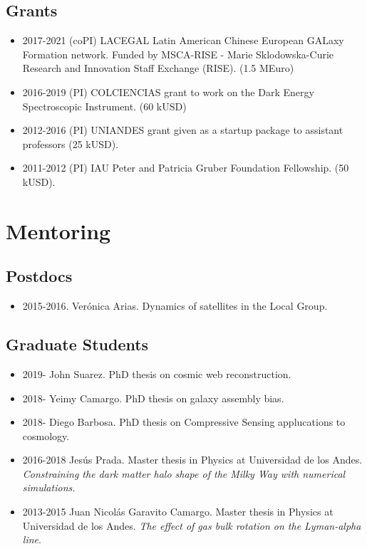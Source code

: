 \documentclass[a4paper,10pt]{article} %
\begin{document}
\subsection{Grants}
\begin{itemize}
\item 2017-2021 (coPI) LACEGAL Latin American Chinese European GALaxy Formation network.
Funded by MSCA-RISE - Marie Sklodowska-Curie Research and Innovation Staff Exchange (RISE). (1.5 MEuro)
\item 2016-2019 (PI) COLCIENCIAS grant to work on the Dark
  Energy Spectroscopic Instrument. (60 kUSD)
\item 2012-2016 (PI) UNIANDES grant given as a startup package to
assistant professors (25 kUSD).
\item 2011-2012 (PI) IAU Peter and Patricia Gruber Foundation
  Fellowship. (50 kUSD).
\end{itemize}

\color{red}
\section{Mentoring}
\color{black}

\subsection{Postdocs}

\begin{itemize}
\item 2015-2016. Ver\'onica Arias. Dynamics of satellites in the
  Local Group.  
\end{itemize}

\subsection{Graduate Students}

\begin{itemize}

\item 2019- John Suarez. PhD thesis on cosmic web reconstruction.
\item 2018- Yeimy Camargo. PhD thesis on galaxy assembly bias.
\item 2018- Diego Barbosa. PhD thesis on Compressive Sensing
  applucations to cosmology.  
\item 2016-2018 Jes\'us Prada.
  Master thesis in Physics at Universidad de los Andes.
\emph{Constraining the dark matter halo shape of the Milky Way with
  numerical simulations.} 
\item 2013-2015 Juan Nicol\'as Garavito Camargo. Master
  thesis in Physics at Universidad de los Andes. \emph{The effect of
    gas bulk rotation on the Lyman-alpha line}.
\end{itemize}
\end{document}
